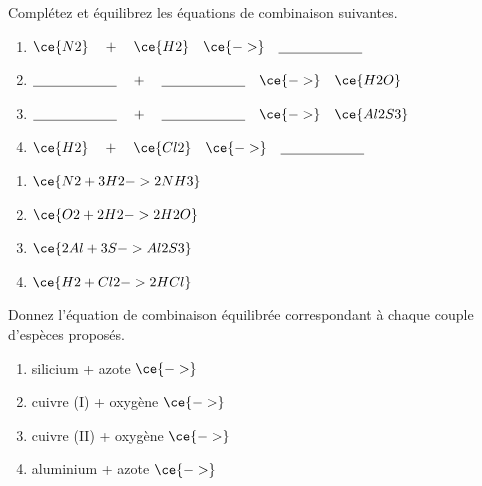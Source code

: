 \documentclass[
  11pt,
  french,
  a4paper,
  openany]{book}
\begin{document}
\begin{Exercise}

Complétez et équilibrez les équations de combinaison suivantes.

\begin{enumerate}
\def\labelenumi{\arabic{enumi}.}
\item
  \(\ce{N2} \quad + \quad \ce{H2} \quad \ce{->} \quad \underline{\hspace{6em}}\)
\item
  \(\underline{\hspace{6em}} \quad + \quad \underline{\hspace{6em}} \quad \ce{->} \quad \ce{H2O}\)
\item
  \(\underline{\hspace{6em}} \quad + \quad \underline{\hspace{6em}} \quad \ce{->} \quad \ce{Al2S3}\)
\item
  \(\ce{H2} \quad + \quad \ce{Cl2} \quad \ce{->} \quad \underline{\hspace{6em}}\)
\end{enumerate}


\end{Exercise}

\begin{Answer}

\begin{enumerate}
\def\labelenumi{\arabic{enumi}.}
\item
  \(\ce{N2 + 3 H2 -> 2 NH3}\)
\item
  \(\ce{O2 + 2 H2 -> 2 H2O}\)
\item
  \(\ce{2Al + 3S -> Al2S3}\)
\item
  \(\ce{H2 + Cl2 -> 2 HCl}\)
\end{enumerate}


\end{Answer}

\begin{Exercise}

Donnez l'équation de combinaison équilibrée correspondant à chaque couple d'espèces proposés.

\begin{enumerate}
\def\labelenumi{\arabic{enumi}.}
\item
  silicium + azote \(\ce{->}\)
\item
  cuivre (I) + oxygène \(\ce{->}\)
\item
  cuivre (II) + oxygène \(\ce{->}\)
\item
  aluminium + azote \(\ce{->}\)
\end{enumerate}


\end{Exercise}
\end{document}

